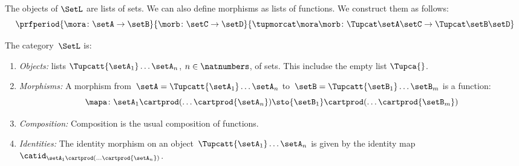 The objects of $\SetL$ are lists of sets.
We can also define morphisms as lists of functions.
We construct them as follows:
%
\begin{equation}
    \label{eq:sets-monoid-maps2}
    \prfperiod{
        \mora \colon \setA \to \setB
    }{
        \morb \colon \setC \to \setD
    }{
        \tupmorcat \mora \morb \colon \Tupcat \setA   \setC \to \Tupcat \setB  \setD
    }
\end{equation}
%


\begin{definition}
    \label{def:SetL}
    The category~$\SetL$ is:
    \begin{enumerate}
        \item \emph{Objects:} lists $\Tupcatt {\setA_1}  \dots {\setA_n}$, $n \in \natnumbers$, of sets. This includse the empty list $\Tupca {}$.
        \item \emph{Morphisms:}
              A morphism from~$\setA =\Tupcatt {\setA_1}  \dots {\setA_n}$ to~$\setB = \Tupcatt {\setB_1} \dots {\setB_m}$ is a function:
              \begin{equation*}
                  \mapa\colon {\setA_1} \cartprod (\ldots \cartprod {\setA_n}) \sto {\setB_1} \cartprod (\ldots \cartprod {\setB_m})
              \end{equation*}
        \item \emph{Composition:}
              Composition is the usual composition of functions.
        \item \emph{Identities:}
              The identity morphism on an object~$\Tupcatt {\setA_1} \dots {\setA_n}$ is given by the identity map~$\catid_{{\setA_1} \cartprod (\ldots \cartprod {\setA_n})}$.
    \end{enumerate}
\end{definition}

